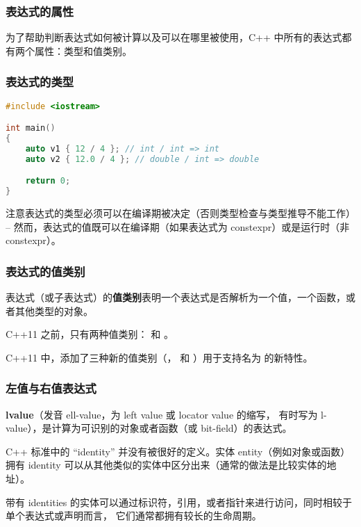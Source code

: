 \documentclass[../../LearnCpp.tex]{subfiles}
\begin{document}

\subsubsection*{表达式的属性}

为了帮助判断表达式如何被计算以及可以在哪里被使用，C++ 中所有的表达式都有两个属性：类型和值类别。

\subsubsection*{表达式的类型}

\begin{lstlisting}[language=C++]
#include <iostream>

int main()
{
    auto v1 { 12 / 4 }; // int / int => int
    auto v2 { 12.0 / 4 }; // double / int => double

    return 0;
}
\end{lstlisting}

注意表达式的类型必须可以在编译期被决定（否则类型检查与类型推导不能工作） --
然而，表达式的值既可以在编译期（如果表达式为 constexpr）或是运行时（非 constexpr）。

\subsubsection*{表达式的值类别}

表达式（或子表达式）的\textbf{值类别}表明一个表达式是否解析为一个值，一个函数，或者其他类型的对象。

C++11 之前，只有两种值类别：  和 。

C++11 中，添加了三种新的值类别（， 和 ）用于支持名为  的新特性。

\subsubsection*{左值与右值表达式}

\textbf{lvalue}（发音 ell-value，为 left value 或 locator value 的缩写，
有时写为 l-value），是计算为可识别的对象或者函数（或 bit-field）的表达式。

C++ 标准中的 “identity” 并没有被很好的定义。实体 entity（例如对象或函数）拥有 identity
可以从其他类似的实体中区分出来（通常的做法是比较实体的地址）。

带有 identities 的实体可以通过标识符，引用，或者指针来进行访问，同时相较于单个表达式或声明而言，
它们通常都拥有较长的生命周期。
\end{document}
